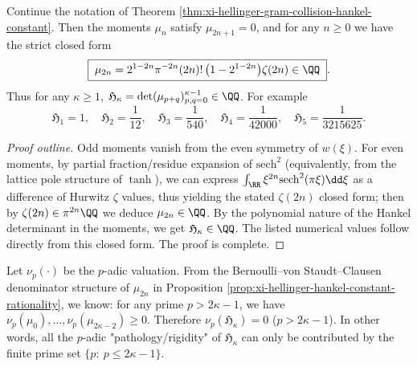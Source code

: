 \begin{proposition}\label{prop:xi-hellinger-hankel-constant-rationality}
Continue the notation of Theorem \ref{thm:xi-hellinger-gram-collision-hankel-constant}.
Then the moments \(\mu_n\) satisfy \(\mu_{2n+1}=0\), and for any \(n\ge 0\) we have the strict closed form
\[
\boxed{\;
\mu_{2n}
=2^{1-2n}\pi^{-2n}(2n)!\,\bigl(1-2^{1-2n}\bigr)\zeta(2n)\in\QQ\; }.
\]
Thus for any \(\kappa\ge 1\), \(\mathfrak H_\kappa=\det(\mu_{p+q})_{p,q=0}^{\kappa-1}\in\QQ\).
For example
\[
\boxed{\;
\mathfrak H_1=1,\quad
\mathfrak H_2=\frac{1}{12},\quad
\mathfrak H_3=\frac{1}{540},\quad
\mathfrak H_4=\frac{1}{42000},\quad
\mathfrak H_5=\frac{1}{3215625}.\;}
\]
\end{proposition}
\begin{proof}[Proof outline]
Odd moments vanish from the even symmetry of \(w(\xi)\).
For even moments, by partial fraction/residue expansion of \(\mathrm{sech}^2\) (equivalently, from the lattice pole structure of \(\tanh\)), we can express
\(\int_{\RR}\xi^{2n}\mathrm{sech}^{2}(\pi\xi)\dd\xi\)
as a difference of Hurwitz \(\zeta\) values, thus yielding the stated \(\zeta(2n)\) closed form; then by
\(\zeta(2n)\in \pi^{2n}\QQ\)
we deduce \(\mu_{2n}\in\QQ\).
By the polynomial nature of the Hankel determinant in the moments, we get \(\mathfrak H_\kappa\in\QQ\).
The listed numerical values follow directly from this closed form. The proof is complete.
\end{proof}

\begin{remark}[Arithmetic bandwidth law: \texorpdfstring{$p$}{p}-adic rigidity of \texorpdfstring{$\mathfrak H_\kappa$}{H_k} supported only on \texorpdfstring{$p\le 2\kappa-1$}{p<=2k-1}]\label{rem:xi-hellinger-hankel-padic-bandwidth}
Let \(\nu_p(\cdot)\) be the \(p\)-adic valuation.
From the Bernoulli--von Staudt--Clausen denominator structure of \(\mu_{2n}\) in Proposition \ref{prop:xi-hellinger-hankel-constant-rationality}, we know:
for any prime \(p>2\kappa-1\), we have \(\nu_p(\mu_0),\dots,\nu_p(\mu_{2\kappa-2})\ge 0\).
Therefore \(\nu_p(\mathfrak H_\kappa)=0\) (\(p>2\kappa-1\)).
In other words, all the \(p\)-adic "pathology/rigidity" of \(\mathfrak H_\kappa\) can only be contributed by the finite prime set \(\{p:\ p\le 2\kappa-1\}\).
\end{remark}

